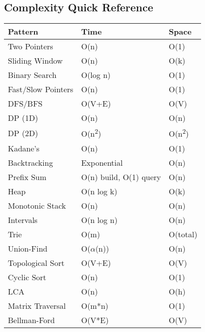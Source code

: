 \documentclass[8pt,landscape]{article}
\begin{document}
\begin{multicols}{3}
\section*{Complexity Quick Reference}
\begin{tabular}{|l|l|l|}
\hline
\textbf{Pattern} & \textbf{Time} & \textbf{Space} \\
\hline
Two Pointers & O(n) & O(1) \\
Sliding Window & O(n) & O(k) \\
Binary Search & O(log n) & O(1) \\
Fast/Slow Pointers & O(n) & O(1) \\
DFS/BFS & O(V+E) & O(V) \\
DP (1D) & O(n) & O(n) \\
DP (2D) & O(n\textsuperscript{2}) & O(n\textsuperscript{2}) \\
Kadane's & O(n) & O(1) \\
Backtracking & Exponential & O(n) \\
Prefix Sum & O(n) build, O(1) query & O(n) \\
Heap & O(n log k) & O(k) \\
Monotonic Stack & O(n) & O(n) \\
Intervals & O(n log n) & O(n) \\
Trie & O(m) & O(total) \\
Union-Find & O($\alpha$(n)) & O(n) \\
Topological Sort & O(V+E) & O(V) \\
Cyclic Sort & O(n) & O(1) \\
LCA & O(n) & O(h) \\
Matrix Traversal & O(m*n) & O(1) \\
Bellman-Ford & O(V*E) & O(V) \\
\hline
\end{tabular}

\end{multicols}
\end{document}
